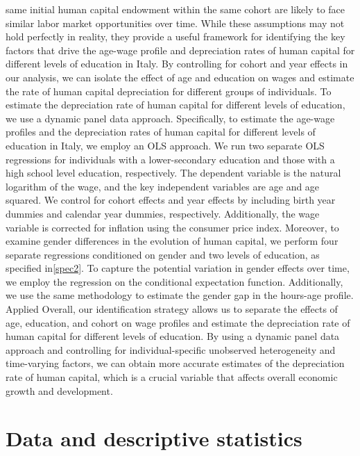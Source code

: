 \documentclass{sistedes}
\begin{document}
same initial human capital endowment within the same cohort are likely to face similar labor market opportunities over
time.\newline
While these assumptions may not hold perfectly in reality, they provide a useful framework for identifying the key
factors that drive the age-wage profile and depreciation rates of human capital for different levels of education in
Italy. By controlling for cohort and year effects in our analysis, we can isolate the effect of age and education on
wages and estimate the rate of human capital depreciation for different groups of individuals.
\newline
To estimate the depreciation rate of human capital for different levels of education, we use a dynamic panel data
approach. Specifically, to estimate the age-wage profiles and the depreciation rates of human capital for different
levels of education in Italy, we employ an OLS approach. We run two separate OLS regressions for individuals with a
lower-secondary education and those with a high school level education, respectively. The dependent variable is the
natural logarithm of the wage, and the key independent variables are age and age squared. We control for cohort effects
and year effects by including birth year dummies and calendar year dummies, respectively. Additionally, the wage
variable is corrected for inflation using the consumer price index.
\newline
Moreover, to examine gender differences in the evolution of human capital, we perform four separate regressions
conditioned on gender and two levels of education, as specified in\ref{spec2}. To capture the potential variation in
gender effects over time, we employ the regression on the conditional expectation function. Additionally, we use the
same methodology to estimate the gender gap in the hours-age profile.
\newline
 Applied Overall, our identification strategy allows us to separate the effects of age, education, and cohort on wage
 profiles and estimate the depreciation rate of human capital for different levels of education. By using a dynamic
 panel data approach and controlling for individual-specific unobserved heterogeneity and time-varying factors, we can
 obtain more accurate estimates of the depreciation rate of human capital, which is a crucial variable that affects
 overall economic growth and development.
\section{Data and descriptive statistics}
\end{document}
